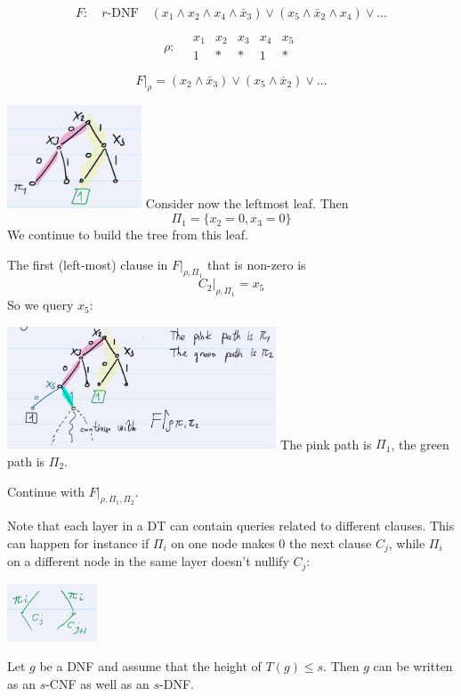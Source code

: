 \[
F: \quad r\text{-DNF} \quad (x_1 \land x_2 \land x_4 \land \bar{x}_3) \lor (x_5 \land \bar{x}_2 \land x_4) \lor \dots
\]

\[
\rho: \quad 
\begin{array}{ccccc}
x_1 & x_2 & x_3 & x_4 & x_5 \\
1 & * & * & 1 & *
\end{array}
\]

\[
F|_{\rho} = (x_2 \land \bar{x}_3) \lor (x_5 \land \bar{x}_2) \lor \dots
\]

\includegraphics[width=0.3\textwidth]{images/ex3-sl-dt.png}
\noindent
Consider now the leftmost leaf. Then
\[
\Pi_1 = \{ x_2 = 0, x_3 = 0 \}
\]
We continue to build the tree from this leaf.

\noindent
The first (left-most) clause in \( F|_{\rho, \Pi_1} \) that is non-zero is
\[
C_2|_{\rho, \Pi_1} = x_5
\]
So we query \( x_5 \):

\noindent
\includegraphics[width=0.6\textwidth]{images/ex4-sl-dt.png}
\noindent
The pink path is \( \Pi_1 \), the green path is \( \Pi_2 \).

\noindent
Continue with \( F|_{\rho, \Pi_1, \Pi_2} \).

\noindent
Note that each layer in a DT can contain queries related to different clauses.
This can happen for instance if \( \Pi_i \) on one node makes 0 the next clause \( C_j \), 
while \( \Pi_i \) on a different node in the same layer doesn't nullify \( C_j \):
 
\includegraphics[width=0.2\textwidth]{images/ex5-sl-dt.png}
\begin{claim}
Let \( g \) be a DNF and assume that the height of \( T(g) \leq s \).
Then \( g \) can be written as an \( s \)-CNF as well as an \( s \)-DNF.
\end{claim}

